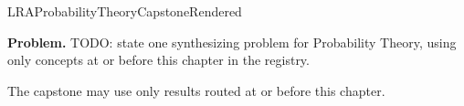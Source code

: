 \ifcsname LRAProbabilityTheoryCapstoneRendered\endcsname
\else
\expandafter\gdef\csname LRAProbabilityTheoryCapstoneRendered\endcsname{}

\newpage
{}
\label{cap:probability-theory}

\begin{tcolorbox}[
  colback=gray!6,
  colframe=gray!40,
  arc=2pt,
  left=8pt, right=8pt, top=6pt, bottom=6pt,
  title={\small\textbf{Capstone Problem}},
  fonttitle=\small\bfseries
]
\textbf{Problem.}
TODO: state one synthesizing problem for Probability Theory, using only concepts at or
before this chapter in the registry.
\end{tcolorbox}

\begin{remark*}
The capstone may use only results routed at or before this chapter.
\end{remark*}

\clearpage
\fi
